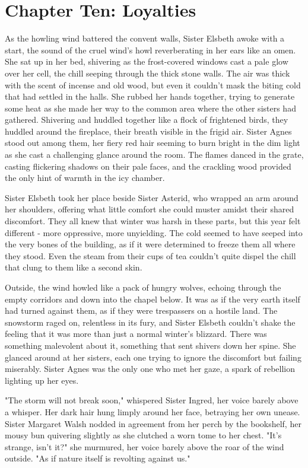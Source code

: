 \documentclass[11pt]{article}
\begin{document}
\section{Chapter Ten: Loyalties}
\label{sec:org1f96697}
As the howling wind battered the convent walls, Sister Elsbeth awoke with a start, the sound of the cruel wind's howl reverberating in her ears like an omen. She sat up in her bed, shivering as the frost-covered windows cast a pale glow over her cell, the chill seeping through the thick stone walls. The air was thick with the scent of incense and old wood, but even it couldn't mask the biting cold that had settled in the halls. She rubbed her hands together, trying to generate some heat as she made her way to the common area where the other sisters had gathered. Shivering and huddled together like a flock of frightened birds, they huddled around the fireplace, their breath visible in the frigid air. Sister Agnes stood out among them, her fiery red hair seeming to burn bright in the dim light as she cast a challenging glance around the room. The flames danced in the grate, casting flickering shadows on their pale faces, and the crackling wood provided the only hint of warmth in the icy chamber.

Sister Elsbeth took her place beside Sister Asterid, who wrapped an arm around her shoulders, offering what little comfort she could muster amidst their shared discomfort. They all knew that winter was harsh in these parts, but this year felt different - more oppressive, more unyielding. The cold seemed to have seeped into the very bones of the building, as if it were determined to freeze  them all where they stood. Even the steam from their cups of tea couldn't quite dispel the chill that clung to them like a second skin.

Outside, the wind howled like a pack of hungry wolves, echoing through the empty corridors and down into the chapel below. It was as if the very earth itself had turned against them, as if they were trespassers on a hostile land. The snowstorm raged on, relentless in its fury, and Sister Elsbeth couldn't shake the feeling that it was more than just a normal winter's blizzard. There was something malevolent about it, something that sent shivers down her spine. She glanced around at her sisters, each one trying to ignore the discomfort but failing miserably. Sister Agnes was the only one who met her gaze, a spark of rebellion lighting up her eyes.

"The storm will not break soon," whispered Sister Ingred, her voice barely above a whisper. Her dark hair hung limply around her face, betraying her own unease. Sister Margaret Walsh nodded in agreement from her perch by the bookshelf, her mousy bun quivering slightly as she clutched a worn tome to her chest. "It's strange, isn't it?" she murmured, her voice barely above the roar of the wind outside. "As if nature itself is revolting against us."
\end{document}

